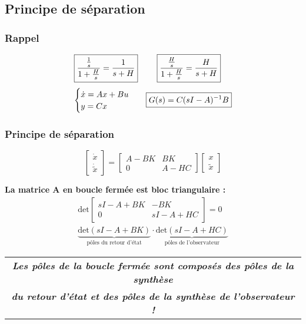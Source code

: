 \documentclass[document.tex]{subfiles}
\begin{document}

\subsection{Principe de séparation}

\subsubsection{Rappel}

$$ \begin{array}{c c}
\boxed{\dfrac{\frac{1}{s}}{1+\frac{H}{s}} = \dfrac{1}{s+H}} & \boxed{\dfrac{\frac{H}{s}}{1+\frac{H}{s}} = \dfrac{H}{s+H}} \\[18pt]
\begin{cases} \dot{x} = Ax + Bu \\ y = Cx\end{cases} & \boxed{G(s) = C(sI-A)^{-1}B}
\end{array} $$

\subsubsection{Principe de séparation}

$$
\begin{bmatrix} \dot{x} \\ \dot{\tilde{x}} \end{bmatrix} = \begin{bmatrix} A - BK & BK \\ 0 & A-HC \end{bmatrix} \begin{bmatrix} x \\ \tilde{x} \end{bmatrix}
$$

\textbf{La matrice A en boucle fermée est bloc triangulaire :}
$$
\begin{array}{c}
\text{det}\begin{bmatrix} sI - A + BK & - B K \\ 0 & sI - A + HC \end{bmatrix} = 0 \\[12pt]
\underbrace{\text{det}(sI - A + BK)}_{\text{pôles du retour d'état}} \cdot \underbrace{\text{det}(sI - A + HC)}_{\text{pôles de l'observateur}}
\end{array}
$$

\begin{flushleft}
\begin{tabular}{|c|}
\hline
\textit{\textbf{Les pôles de la boucle fermée sont composés des pôles de la synthèse}}\\
\textit{\textbf{du retour d'état et des pôles de la synthèse de l'observateur !}} \\ \hline
\end{tabular}
\end{flushleft}
\end{document}

